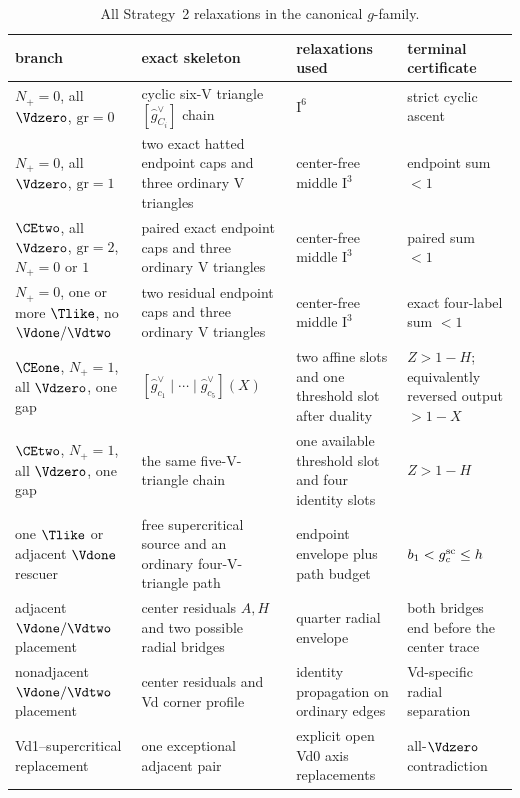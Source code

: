 \begin{table}[H]
\centering
\scriptsize
\renewcommand{\arraystretch}{1.12}
\begin{tabular}{@{}p{}p{}p{}p{}@{}}
\toprule
branch&exact skeleton&relaxations used&terminal certificate\\
\midrule
$N_+=0$, all $\Vdzero$, $\mathrm{gr}=0$&
cyclic six-V triangle $[\widehat g_{C_i}^\vee]$ chain&
$\mathrm I^6$&
strict cyclic ascent\\
$N_+=0$, all $\Vdzero$, $\mathrm{gr}=1$&
two exact hatted endpoint caps and three ordinary V triangles&
center-free middle $\mathrm I^3$&
endpoint sum $<1$\\
$\CEtwo$, all $\Vdzero$, $\mathrm{gr}=2$, $N_+=0$ or $1$&
paired exact endpoint caps and three ordinary V triangles&
center-free middle $\mathrm I^3$&
paired sum $<1$\\
$N_+=0$, one or more $\Tlike$, no $\Vdone/\Vdtwo$&
two residual endpoint caps and three ordinary V triangles&
center-free middle $\mathrm I^3$&
exact four-label sum $<1$\\
$\CEone$, $N_+=1$, all $\Vdzero$, one gap&
$[\widehat g_{c_1}^\vee\mid\cdots\mid\widehat g_{c_5}^\vee](X)$&
two affine slots and one threshold slot after duality&
$Z>1-H$; equivalently reversed output $>1-X$\\
$\CEtwo$, $N_+=1$, all $\Vdzero$, one gap&
the same five-V-triangle chain&
one available threshold slot and four identity slots&
$Z>1-H$\\
one $\Tlike$ or adjacent $\Vdone$ rescuer&
free supercritical source and an ordinary four-V-triangle path&
endpoint envelope plus path budget&
$b_1<g_c^{\rm sc}\le h$\\
adjacent $\Vdone/\Vdtwo$ placement&
center residuals $A,H$ and two possible radial bridges&
quarter radial envelope&
both bridges end before the center trace\\
nonadjacent $\Vdone/\Vdtwo$ placement&
center residuals and Vd corner profile&
identity propagation on ordinary edges&
Vd-specific radial separation\\
Vd1--supercritical replacement&
one exceptional adjacent pair&
explicit open Vd0 axis replacements&
all-$\Vdzero$ contradiction\\
\bottomrule
\end{tabular}
\caption{All Strategy~2 relaxations in the canonical \(g\)-family.}
\label{tab:strategy2-chain-signatures}
\end{table}

